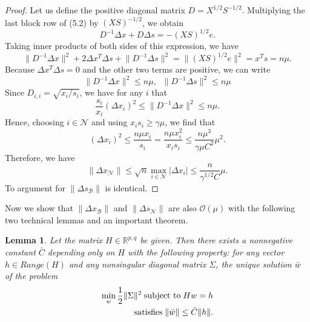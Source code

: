 \documentclass[a4paper,10 pt,titlepage,twoside]{book}
\theoremstyle{plain}
\newtheorem{lem}[thm]{Lemma}
\theoremstyle{definition}
\theoremstyle{remark}
\begin{document}
\begin{proof}
	Let us define the positive diagonal matrix $D = X^{1/2}S^{-1/2}$. Multiplying the last block row of (5.2) by $(XS)^{-1/2}$, we obtain 
	\begin{equation*}
	D^{-1}\Delta x + D \Delta s = -(XS)^{1/2}e.
	\end{equation*}
	Taking inner products of both sides of this expression, we have
		\begin{equation*}
	\lVert D^{-1}\Delta x \rVert^{2} + 2\Delta x^{T}\Delta s+ \lVert D^{-1}\Delta s \rVert^{2}= \lVert(XS)^{1/2}e\rVert^{2}= x^{T}s= n\mu.
	\end{equation*}
	Because $\Delta x^{T}\Delta s= 0$ and the other two terms are positive, we can write
	\begin{equation*}
	\lVert D^{-1}\Delta x\rVert^{2}\leq n\mu, \;\;\lVert D^{-1}\Delta s\rVert^{2}\leq n\mu
	\end{equation*}
	Since $D_{i,i}= \sqrt{x_{i}/s_{i}}$, we have for any $i$ that
	\begin{equation*}
	\frac{s_{i}}{x_{i}}(\Delta x_{i})^{2}\leq\lVert D^{-1}\Delta x\rVert^{2}\leq n\mu.
	\end{equation*}
	Hence, choosing $i\in\mathcal{N}$ and using $x_{i}s_{i}\geq\gamma\mu$, we find that
	\begin{equation*}
	(\Delta x_{i})^{2}\leq\frac{n\mu x_{i}}{s_{i}}=\frac{n\mu x_{i}^{2}}{x_{i}s_{i}}\leq\frac{n\mu^{3}}{\gamma\mu C^{2}}\mu^{2}.
	\end{equation*}
	Therefore, we have 
	\begin{equation*}
	\lVert \Delta x_{\mathcal{N}}\rVert \leq \sqrt{n}\max\limits_{i \in \mathcal{N}}|\Delta x_{i}|\leq\frac{n}{\gamma^{1/2}C}\mu.
	\end{equation*}
	To argument for $\lVert \Delta s_{\mathcal{B}}\rVert$ is identical.
\end{proof}
Now we show that $\lVert \Delta x_{\mathcal{B}}\rVert$ and $\lVert \Delta s_{\mathcal{N}}\rVert$ are also $\mathcal{O}(\mu)$ with the following two technical lemmas and an important theorem.
\begin{lem} \label{(T)}
	Let the matrix $H\in\mathbb{R}^{p,q}$ be given. Then there exists a nonnegative constant $\bar{C}$ depending only on $H$ with the following property: for any vector $h\in Range(H)$ and any nonsingular diagonal matrix $\Sigma$, the unique solution $\bar{w}$ of the problem
	\begin{align*}
	\min\limits_{w}\frac{1}{2}\lVert\Sigma\rVert^{2} \text{\;subject to\;} Hw = h\\\text{satisfies\;} \lVert\bar{w}\rVert\leq \bar{C}\lVert h\rVert.
	\end{align*}
\end{lem}
\end{document}
